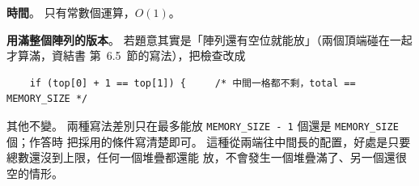 \begin{pastsoln}
\textbf{時間}。 只有常數個運算，$O(1)$。

\textbf{用滿整個陣列的版本}。 若題意其實是「陣列還有空位就能放」（兩個頂端碰在一起才算滿，資結書
第~6.5~節的寫法），把檢查改成
\begin{verbatim}
    if (top[0] + 1 == top[1]) {     /* 中間一格都不剩，total == MEMORY_SIZE */
\end{verbatim}
其他不變。 兩種寫法差別只在最多能放 \texttt{MEMORY\_SIZE - 1} 個還是 \texttt{MEMORY\_SIZE} 個；作答時
把採用的條件寫清楚即可。 這種從兩端往中間長的配置，好處是只要總數還沒到上限，任何一個堆疊都還能
放，不會發生一個堆疊滿了、另一個還很空的情形。
\end{pastsoln}
